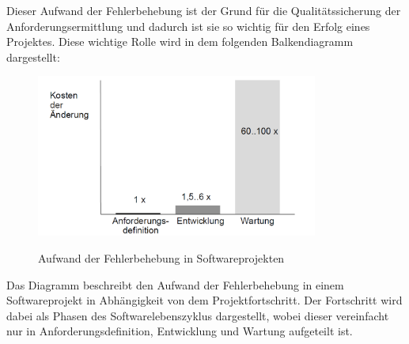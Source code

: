 \documentclass [12pt, a4paper, oneside, titlepage, ngerman]{article}
\begin{document}
\noindent Dieser Aufwand der Fehlerbehebung ist der Grund für die Qualitätssicherung der Anforderungsermittlung und dadurch ist sie so wichtig für den Erfolg eines Projektes. Diese wichtige Rolle wird in dem folgenden Balkendiagramm dargestellt:
\begin{figure}[H]
	\hspace{-2cm}
	\centering
	\includegraphics[width=350px,keepaspectratio]{TUDresden.png}
	\caption{Aufwand der Fehlerbehebung in Softwareprojekten}
	\cite[S.2]{hussmann}
	\label{img:TUDresden}
\end{figure}
\noindent Das Diagramm beschreibt den Aufwand der Fehlerbehebung in einem Softwareprojekt in Abhängigkeit von dem Projektfortschritt. Der Fortschritt wird dabei als Phasen des Softwarelebenszyklus dargestellt, wobei dieser vereinfacht nur in Anforderungsdefinition, Entwicklung und Wartung aufgeteilt ist. \\
\end{document}
